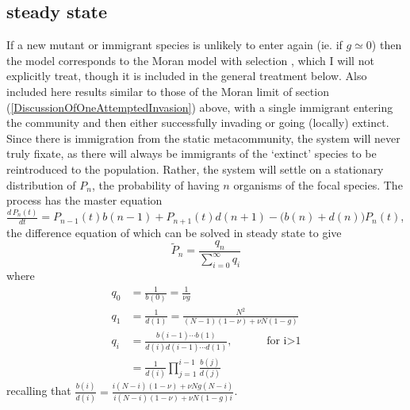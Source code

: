 \subsection{steady state}
If a new mutant or immigrant species is unlikely to enter again (ie. if $g\simeq 0$) then the model corresponds to the Moran model with selection \cite{???}, which I will not explicitly treat, though it is included in the general treatment below. %
Also included here results similar to those of the Moran limit of section (\ref{DiscussionOfOneAttemptedInvasion}) above, with a single immigrant entering the community and then either successfully invading or going (locally) extinct. 
Since there is immigration from the static metacommunity, the system will never truly fixate, as there will always be immigrants of the `extinct' species to be reintroduced to the population.  
Rather, the system will settle on a stationary distribution of $P_n$, the probability of having $n$ organisms of the focal species. 
The process has the master equation $\frac{d\,P_n(t)}{dt} = P_{n-1}(t)b(n-1) + P_{n+1}(t)d(n+1) - \big(b(n)+d(n)\big)P_n(t)$,
the difference equation of which can be solved in steady state to give
\begin{equation}
\widetilde{P}_n = \frac{q_n}{\sum_{i=0}^\infty q_i}
\end{equation}
where
\begin{align*}
 q_0 &= \frac{1}{b(0)} = \frac{1}{\nu g} \\
 q_1 &= \frac{1}{d(1)} = \frac{N^2}{(N-1)(1-\nu) + \nu N(1-g)} \\
 q_i &= \frac{b(i-1)\cdots b(1)}{d(i)d(i-1)\cdots d(1)}, \text{  }\hspace{1cm} \text{for i>1} \\
     &= \frac{1}{d(i)}\prod_{j=1}^{i-1}\frac{b(j)}{d(j)}
\end{align*}
recalling that $\frac{b(i)}{d(i)} = \frac{i(N-i)(1-\nu) + \nu Ng(N-i)}{i(N-i)(1-\nu) + \nu N(1-g)i}$.
